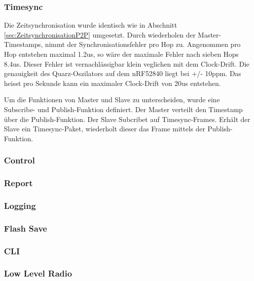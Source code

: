 \subsubsection{Timesync}\label{subsubsec:Timesync}

Die Zeitsynchronisation wurde identisch wie in Abschnitt \ref{sec:ZeitsynchronisationP2P} umgesetzt. Durch wiederholen der Master-Timestamps, nimmt der Synchronisationsfehler pro Hop zu. Angenommen pro Hop entstehen maximal 1.2us, so wäre der maximale Fehler nach sieben Hops 8.4us. Dieser Fehler ist vernachlässigbar klein veglichen mit dem Clock-Drift. Die genauigkeit des Quarz-Oszilators auf dem nRF52840 liegt bei +/- 10ppm. Das heisst pro Sekunde kann ein maximaler Clock-Drift von 20us entstehen. 

Um die Funktionen von Master und Slave zu unterscheiden, wurde eine Subscribe- und Publish-Funktion definiert. Der Master verteilt den Timestamp über die Publish-Funktion. Der Slave Subcribet auf Timesync-Frames. Erhält der Slave ein Timesync-Paket, wiederholt dieser das Frame mittels der Publish-Funktion. 

\subsubsection{Control}\label{subsubsec:Control}

\subsubsection{Report}\label{subsubsec:Report}

\subsubsection{Logging}\label{subsubsec:Logging}

\subsubsection{Flash Save}\label{subsubsec:FlashSave}

\subsubsection{CLI}\label{subsubsec:CLI}

\subsubsection{Low Level Radio}\label{subsubsec:LowLevelRadio}


